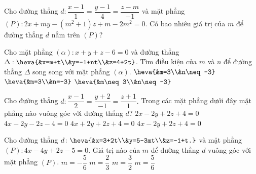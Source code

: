\begin{ex}
	Cho đường thẳng $d:\dfrac{x-1}{1}=\dfrac{y-1}{4}=\dfrac{z-m}{-1}$ và mặt phẳng $(P): 2x+my-(m^2+1)z+m-2m^2=0$. Có bao nhiêu giá trị của $m$ để đường thẳng $d$ nằm trên $(P)$?
	\loigiai{
	}
\end{ex}


\begin{ex}
	Cho mặt phẳng $(\alpha): x+y+z-6=0$ và đường thẳng $\Delta:\heva{&x=m+t\\&y=-1+nt\\&z=4+2t}$. Tìm điều kiện của $m$ và $n$ để đường thẳng $\Delta$ song song với mặt phẳng $(\alpha)$.
	{$\heva{&m=3\\&n\neq -3}$}
	{$\heva{&m=3\\&n=-3}$}
	{$\heva{&m\neq 3\\&n\neq -3}$}
	\loigiai{
	}
\end{ex}

\begin{ex}
	Cho đường thẳng $d\colon \dfrac{x-1}{2}=\dfrac{y+2}{-1}=\dfrac{z+1}{1}.$ Trong các mặt phẳng dưới đây mặt phẳng nào vuông góc với đường thẳng $d$?
	\choice
	{$2x-2y+2z+4=0$}
	{$4x-2y-2z-4=0$}
	{$4x+2y+2z+4=0$}
	{\True $4x-2y+2z+4=0$}
\end{ex}

\begin{ex}
	Cho đường thẳng $d\colon\heva{&x=3+2t\\&y=5-3mt\\&z=-1+t.}$ và mặt phẳng $(P)\colon4x-4y+2z-5=0$. Giá trị nào của $m$ để đường thẳng $d$ vuông góc với mặt phẳng $(P)$.
	\choice
	{$m=-\dfrac{5}{6}$}
	{\True $m=\dfrac{2}{3}$}
	{$m=\dfrac{3}{2}$}
	{$m=\dfrac{5}{6}$}
\end{ex}

